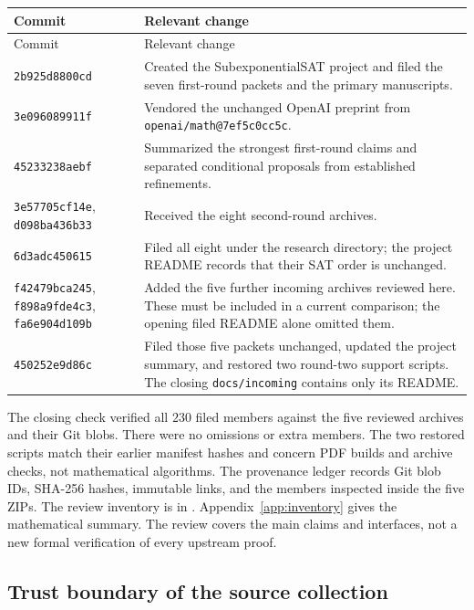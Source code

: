 \documentclass[11pt,letterpaper]{article}
\theoremstyle{remark}\newtheorem{remark}[theorem]{Remark}
\begin{document}
\begin{longtable}{@{}p{}p{}@{}}
\toprule Commit & Relevant change\\\midrule\endfirsthead
\toprule Commit & Relevant change\\\midrule\endhead
\texttt{2b925d8800cd} & Created the SubexponentialSAT project and filed the
seven first-round packets and the primary manuscripts.\\
\texttt{3e096089911f} & Vendored the unchanged OpenAI preprint from
\texttt{openai/math@7ef5c0cc5c}.\\
\texttt{45233238aebf} & Summarized the strongest first-round claims and
separated conditional proposals from established refinements.\\
\texttt{3e57705cf14e}, \texttt{d098ba436b33} & Received the eight second-round
archives.\\
\texttt{6d3adc450615} & Filed all eight under the research directory;
the project README records that their SAT order is unchanged.\\
\texttt{f42479bca245}, \texttt{f898a9fde4c3}, \texttt{fa6e904d109b}
& Added the five further incoming archives reviewed here. These must be
included in a current comparison; the opening filed README alone omitted them.\\
\texttt{450252e9d86c} & Filed those five packets unchanged, updated the
project summary, and restored two round-two support scripts. The closing
\texttt{docs/incoming} contains only its README.\\
\bottomrule
\end{longtable}

The closing check verified all $230$ filed members against the five reviewed
archives and their Git blobs. There were no omissions or extra members.
The two restored scripts match their earlier manifest hashes and concern
PDF builds and archive checks, not mathematical algorithms.
The provenance ledger records Git blob IDs, SHA-256 hashes, immutable links,
and the members inspected inside the five ZIPs. The review inventory is in
. Appendix~\ref{app:inventory} gives
the mathematical summary. The review covers the main claims and interfaces,
not a new formal verification of every upstream proof.

\subsection{Trust boundary of the source collection}
\end{document}
